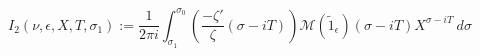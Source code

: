 \begin{definition}[I₂]
\label{I2}
\leanok
$$
  I_2(\nu, \epsilon, X, T, \sigma_1) := \frac{1}{2\pi i} \int_{\sigma_1}^{\sigma_0}
  \left(
  \frac{-\zeta'}\zeta(\sigma - i T)
  \right)
    \mathcal M(\widetilde 1_\epsilon)(\sigma - i T)
  X^{\sigma - i T} \ d\sigma
  $$
\end{definition}
